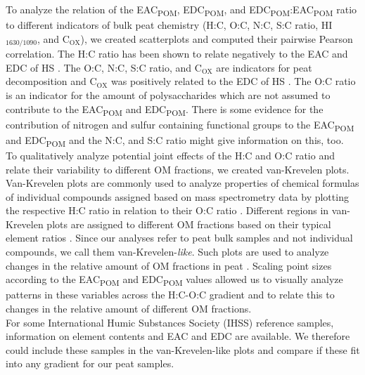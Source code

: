 \documentclass[alpha-refs]{wiley-article-rmd}
\begin{document}
\begin{refsection}
To analyze the relation of the EAC\textsubscript{POM}, EDC\textsubscript{POM}, and EDC\textsubscript{POM}:EAC\textsubscript{POM} ratio to different indicators of bulk peat chemistry (H:C, O:C, N:C, S:C ratio, HI\(_\text{1630/1090}\), and C\(_\text{OX}\)), we created scatterplots and computed their pairwise Pearson correlation. The H:C ratio has been shown to relate negatively to the EAC and EDC of HS \autocite{Aeschbacher.2010,Tan.2017,Lv.2018}. The O:C, N:C, S:C ratio, and C\(_\text{OX}\) are indicators for peat decomposition \autocite{Masiello.2008,Biester.2014,Leifeld.2012} and C\(_\text{OX}\) was positively related to the EDC of HS \autocite{Lv.2018}. The O:C ratio is an indicator for the amount of polysaccharides \autocite{Kim.2003} which are not assumed to contribute to the EAC\textsubscript{POM} and EDC\textsubscript{POM}. There is some evidence for the contribution of nitrogen and sulfur containing functional groups to the EAC\textsubscript{POM} and EDC\textsubscript{POM} \autocite{Ratasuk.2007,Fimmen.2007,HernandezMontoya.2012} and the N:C, and S:C ratio might give information on this, too.\\
To qualitatively analyze potential joint effects of the H:C and O:C ratio and relate their variability to different OM fractions, we created van-Krevelen plots.
Van-Krevelen plots are commonly used to analyze properties of chemical formulas of individual compounds assigned based on mass spectrometry data by plotting the respective H:C ratio in relation to their O:C ratio \autocite{Kim.2003}. Different regions in van-Krevelen plots are assigned to different OM fractions based on their typical element ratios \autocite{Kim.2003}. Since our analyses refer to peat bulk samples and not individual compounds, we call them van-Krevelen-\emph{like}. Such plots are used to analyze changes in the relative amount of OM fractions in peat \autocite{Leifeld.2012,Bader.2018}. Scaling point sizes according to the EAC\textsubscript{POM} and EDC\textsubscript{POM} values allowed us to visually analyze patterns in these variables across the H:C-O:C gradient and to relate this to changes in the relative amount of different OM fractions.\\
For some International Humic Substances Society (IHSS) reference samples, information on element contents \autocite{HuffmanLaboratories.NA} and EAC and EDC \autocite{Aeschbacher.2012} are available. We therefore could include these samples in the van-Krevelen-like plots and compare if these fit into any gradient for our peat samples.


\end{refsection}
\end{document}
